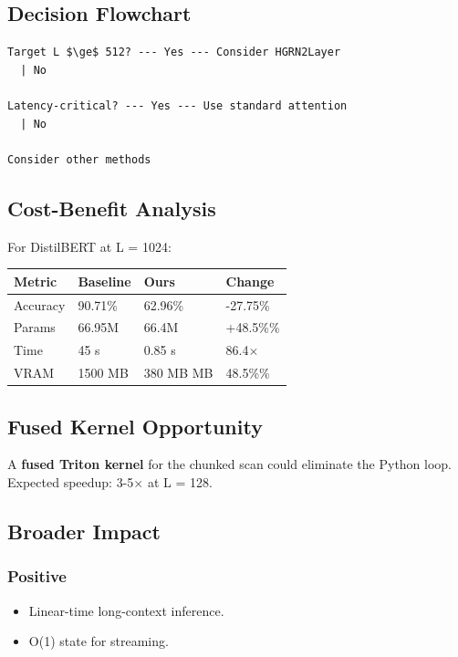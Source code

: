 \subsection{Decision Flowchart}

\begin{lstlisting}
Target L $\ge$ 512? --- Yes --- Consider HGRN2Layer
  | No
   
Latency-critical? --- Yes --- Use standard attention
  | No
   
Consider other methods
\end{lstlisting}

\subsection{Cost-Benefit Analysis}

For DistilBERT at L = 1024:

\begin{table}[H]
\centering
\small
\begin{tabular}{llll}
\toprule
\textbf{Metric} & \textbf{Baseline} & \textbf{Ours} & \textbf{Change} \\
\midrule
Accuracy & 90.71\% & 62.96\% & -27.75\% \\
Params & 66.95M & 66.4M & +48.5\%\% \\
Time & 45 s & 0.85 s & 86.4$\times$ \\
VRAM & 1500 MB & 380 MB MB & 48.5\%\% \\
\bottomrule
\end{tabular}
\end{table}

\subsection{Fused Kernel Opportunity}

A \textbf{fused Triton kernel} for the chunked scan could eliminate the Python 
loop. Expected speedup: 3-5$\times$ at L = 128.

\subsection{Broader Impact}

\subsubsection{Positive}
\begin{itemize}
\item Linear-time long-context inference.
\item O(1) state for streaming.

\end{itemize}
